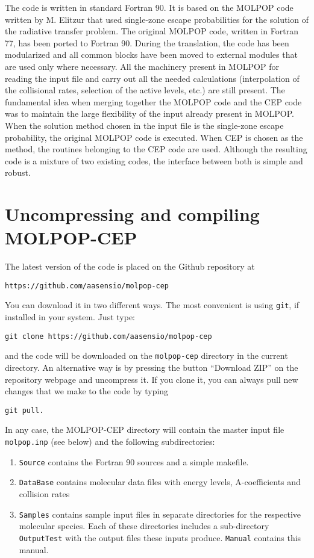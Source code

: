 \documentclass[12pt]{article}
\begin{document}
The code is written in standard Fortran 90. It is based on the MOLPOP code
written by M. Elitzur that used single-zone escape probabilities for the
solution of the radiative transfer problem. The original MOLPOP code, written
in Fortran 77, has been ported to Fortran 90. During the translation, the code
has been modularized and all common blocks have been moved to external modules
that are used only where necessary. All the machinery present in MOLPOP for
reading the input file and carry out all the needed calculations (interpolation
of the collisional rates, selection of the active levels, etc.) are still
present. The fundamental idea when merging together the MOLPOP code and the CEP
code was to maintain the large flexibility of the input already present in
MOLPOP. When the solution method chosen in the input file is the single-zone
escape probability, the original MOLPOP code is executed. When CEP is chosen as
the method, the routines belonging to the CEP code are used. Although the
resulting code is a mixture of two existing codes, the interface between both
is simple and robust.

\section{Uncompressing and compiling MOLPOP-CEP}

The latest version of the code is placed on the Github repository at
\begin{verbatim}
https://github.com/aasensio/molpop-cep
\end{verbatim}
You can download it
in two different ways. The most convenient is using \texttt{git}, if installed in
your system. Just type:
\begin{verbatim}
git clone https://github.com/aasensio/molpop-cep
\end{verbatim}
and the code will be downloaded on the \texttt{molpop-cep} directory in the
current directory. An alternative way is by pressing the button ``Download ZIP''
on the repository webpage and uncompress it. If you clone it, you can always
pull new changes that we make to the code by typing
\begin{verbatim}
git pull.
\end{verbatim}
In any case, the MOLPOP-CEP directory
will contain the master input file \texttt{molpop.inp} (see below) and the
following subdirectories:

\begin{enumerate}
\item
{\tt Source} contains the Fortran 90 sources and a simple makefile.
\item
{\tt DataBase} contains molecular data files with energy levels,
A-coefficients and collision rates
\item
{\tt Samples} contains sample input files in separate directories for the
respective molecular species. Each of these directories includes a
sub-directory \texttt{OutputTest} with the output files these inputs produce.
{\tt Manual} contains this manual.
\end{enumerate}
\end{document}
